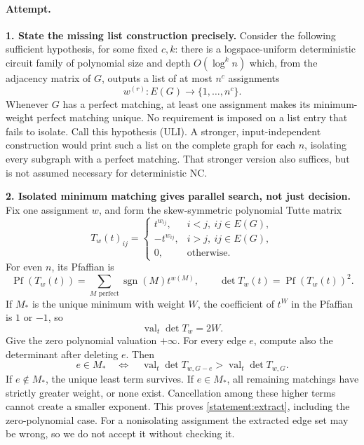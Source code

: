 \documentclass[11pt,a4paper]{article}
\numberwithin{equation}{section}
\begin{document}
\paragraph{Attempt.}
\textbf{1. State the missing list construction precisely.}
Consider the following sufficient hypothesis, for some fixed $c,k$:
there is a logspace-uniform deterministic circuit family of polynomial
size and depth $O(\log^k n)$ which, from the adjacency matrix of $G$,
outputs a list of at most $n^c$ assignments
\[
 w^{(r)}:E(G)\longrightarrow\{1,\ldots,n^c\}.
\]
Whenever $G$ has a perfect matching, at least one assignment makes its
minimum-weight perfect matching unique. No requirement is imposed on a
list entry that fails to isolate. Call this hypothesis (ULI).
A stronger, input-independent construction would print such a list on
the complete graph for each $n$, isolating every subgraph with a perfect
matching. That stronger version also suffices, but is not assumed
necessary for deterministic NC.

\textbf{2. Isolated minimum matching gives parallel search, not just decision.}
Fix one assignment $w$, and form the skew-symmetric polynomial Tutte
matrix
\[
 T_w(t)_{ij}=\begin{cases}
 t^{w_{ij}},&i<j,\ ij\in E(G),\\
 -t^{w_{ij}},&i>j,\ ij\in E(G),\\
 0,&\text{otherwise}.
 \end{cases}
\]
For even $n$, its Pfaffian is
\[
 \operatorname{Pf}(T_w(t))=
    \sum_{M\text{ perfect}}\operatorname{sgn}(M)t^{w(M)},
 \qquad \det T_w(t)=\operatorname{Pf}(T_w(t))^2.
\]
If $M_*$ is the unique minimum with weight $W$, the coefficient of
$t^W$ in the Pfaffian is $1$ or $-1$, so
\begin{equation}\label{statement:valuation}
 \operatorname{val}_t\det T_w=2W.
\end{equation}
Give the zero polynomial valuation $+\infty$. For every edge $e$,
compute also the determinant after deleting $e$. Then
\begin{equation}\label{statement:extract}
 e\in M_*
 \quad\Longleftrightarrow\quad
 \operatorname{val}_t\det T_{w,G-e}>\operatorname{val}_t\det T_{w,G}.
\end{equation}
If $e\notin M_*$, the unique least term survives. If $e\in M_*$,
all remaining matchings have strictly greater weight, or none exist.
Cancellation among these higher terms cannot create a smaller exponent.
This proves \eqref{statement:extract}, including the zero-polynomial case.
For a nonisolating assignment the extracted edge set may be wrong, so
we do not accept it without checking it.
\end{document}
